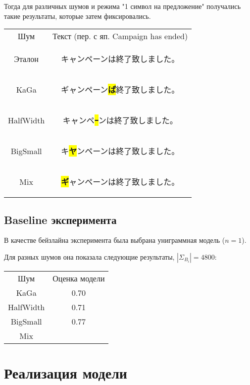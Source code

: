 Тогда для различных шумов и режима "1 символ на предложение" получались такие результаты, которые затем фиксировались.

\begin{tabular}{c|c}
	Шум 	& Текст (пер. с яп. Campaign has ended)\\
	Эталон 	& \begin{CJK}{UTF8}{min}キャンペーンは終了致しました。 \end{CJK} \\
	KaGa	&  \begin{CJK}{UTF8}{min}ギャンペーン\colorbox{yellow}{\textbf{ぱ}}終了致しました。 \end{CJK} \\
	HalfWidth &  \begin{CJK}{UTF8}{min}キャンペ\colorbox{yellow}{\textbf{ｰ}}ンは終了致しました。 \end{CJK} \\
	BigSmall &  \begin{CJK}{UTF8}{min}キ\colorbox{yellow}{\textbf{ヤ}}ンペーンは終了致しました。 \end{CJK} \\
	Mix 	&  \begin{CJK}{UTF8}{min}\colorbox{yellow}{\textbf{ギ}}ャンペーンは終了致しました。 \end{CJK} 
\end{tabular}

\subsection{ Baseline эксперимента }

В качестве бейзлайна эксперимента была выбрана униграммная модель ($n = 1$).

Для разных шумов она показала следующие результаты, $|\Sigma_{B_i}| = 4800$:

\begin{tabular}{c|c}
	Шум 	& Оценка модели \\
	KaGa	& 0.70  \\
	HalfWidth &  0.71 \\
	BigSmall & 0.77  \\
	Mix 	&  
\end{tabular}


\newpage
\section{ Реализация модели }\label{sec:coding}

